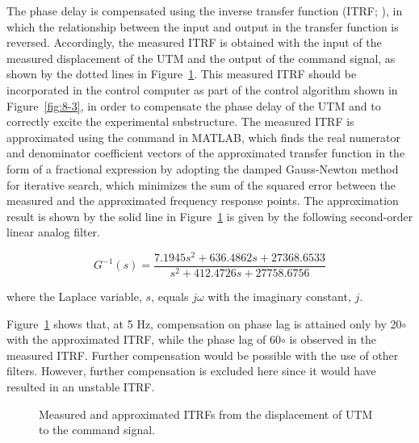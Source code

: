 The phase delay is compensated using the inverse transfer function (ITRF; \citet{lee2007real,lee2007realb}), in which the relationship between the input and output in the transfer function is reversed. Accordingly, the measured ITRF is obtained with the input of the measured displacement of the UTM and the output of the command signal, as shown by the dotted lines in Figure~\ref{fig:8-6}. This measured ITRF should be incorporated in the control computer as part of the control algorithm shown in Figure~\ref{fig:8-3}, in order to compensate the phase delay of the UTM and to correctly excite the experimental substructure. The measured ITRF is approximated using the  command in MATLAB\citep{coleman1999optimization}, which finds the real numerator and denominator coefficient vectors of the approximated transfer function in the form of a fractional expression by adopting the damped Gauss-Newton method for iterative search, which minimizes the sum of the squared error between the measured and the approximated frequency response points\citep{dennis1983numerical}. The approximation result is shown by the solid line in Figure~\ref{fig:8-6} is given by the following second-order linear analog filter.

\begin{equation}\label{eq:8-11}
G^{-1}(s) = \frac{7.1945s^2 + 636.4862s + 27368.6533}{s^2 + 412.4726s + 27758.6756}
\end{equation}

where the Laplace variable, $s$, equals $j\omega$ with the imaginary constant, $j$.

Figure~\ref{fig:8-6} shows that, at 5 Hz, compensation on phase lag is attained only by 20$\circ$ with the approximated ITRF, while the phase lag of 60$\circ$ is observed in the measured ITRF. Further compensation would be possible with the use of other filters. However, further compensation is excluded here since it would have resulted in an unstable ITRF.

\begin{figure}[H]
\centering
{}
\caption{Measured and approximated ITRFs from the displacement of UTM to the command signal.}
\label{fig:8-6}
\end{figure}

